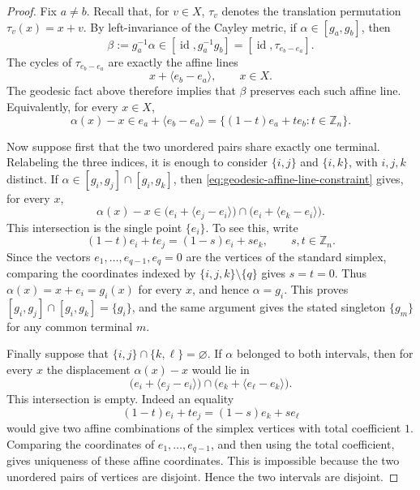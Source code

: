 \documentclass[11pt,oneside,letterpaper]{article}
\numberwithin{equation}{section}
\theoremstyle{definition}
\theoremstyle{remark}
\DeclareMathOperator{\id}{id}
\begin{document}
\begin{proof}
  Fix $a\ne b$.  Recall that, for $v\in X$, $\tau_v$ denotes the
  translation permutation $\tau_v(x)=x+v$.  By left-invariance of the
  Cayley metric, if
  $\alpha\in[g_a,g_b]$, then
  \begin{equation}
    \beta:=g_a^{-1}\alpha\in[\id,g_a^{-1}g_b]
    =
    [\id,\tau_{e_b-e_a}].
  \end{equation}
  The cycles of $\tau_{e_b-e_a}$ are exactly the affine lines
  \begin{equation}
    x+\langle e_b-e_a\rangle,\qquad x\in X.
  \end{equation}
  The geodesic fact above therefore implies that $\beta$ preserves each
  such affine line.  Equivalently, for every $x\in X$,
  \begin{equation}
    \label{eq:geodesic-affine-line-constraint}
    \alpha(x)-x
    \in e_a+\langle e_b-e_a\rangle
    =
    \{(1-t)e_a+te_b:t\in\mathbb Z_n\}.
  \end{equation}

  Now suppose first that the two unordered pairs share exactly one
  terminal.  Relabeling the three indices, it is enough to consider
  $\{i,j\}$ and $\{i,k\}$, with $i,j,k$ distinct.  If
  $\alpha\in[g_i,g_j]\cap[g_i,g_k]$, then
  \eqref{eq:geodesic-affine-line-constraint} gives, for every $x$,
  \begin{equation}
    \alpha(x)-x\in
    \bigl(e_i+\langle e_j-e_i\rangle\bigr)
    \cap
    \bigl(e_i+\langle e_k-e_i\rangle\bigr).
  \end{equation}
  This intersection is the single point $\{e_i\}$.  To see this, write
  \begin{equation}
    (1-t)e_i+te_j=(1-s)e_i+se_k,\qquad s,t\in\mathbb Z_n.
  \end{equation}
  Since the vectors $e_1,\ldots,e_{q-1},e_q=0$ are the vertices of the
  standard simplex, comparing the coordinates indexed by
  $\{i,j,k\}\setminus\{q\}$ gives $s=t=0$.  Thus
  $\alpha(x)=x+e_i=g_i(x)$ for every $x$, and hence
  $\alpha=g_i$.  This proves
  $[g_i,g_j]\cap[g_i,g_k]=\{g_i\}$, and the same argument gives the
  stated singleton $\{g_m\}$ for any common terminal $m$.

  Finally suppose that $\{i,j\}\cap\{k,\ell\}=\varnothing$.  If
  $\alpha$ belonged to both intervals, then for every $x$ the
  displacement $\alpha(x)-x$ would lie in
  \begin{equation}
    \bigl(e_i+\langle e_j-e_i\rangle\bigr)
    \cap
    \bigl(e_k+\langle e_\ell-e_k\rangle\bigr).
  \end{equation}
  This intersection is empty.  Indeed an equality
  \begin{equation}
    (1-t)e_i+te_j=(1-s)e_k+se_\ell
  \end{equation}
  would give two affine combinations of the simplex vertices with total
  coefficient $1$.  Comparing the coordinates of
  $e_1,\ldots,e_{q-1}$, and then using the total coefficient, gives
  uniqueness of these affine coordinates.  This is impossible because
  the two unordered pairs of vertices are disjoint.  Hence the two
  intervals are disjoint.
\end{proof}
\end{document}
